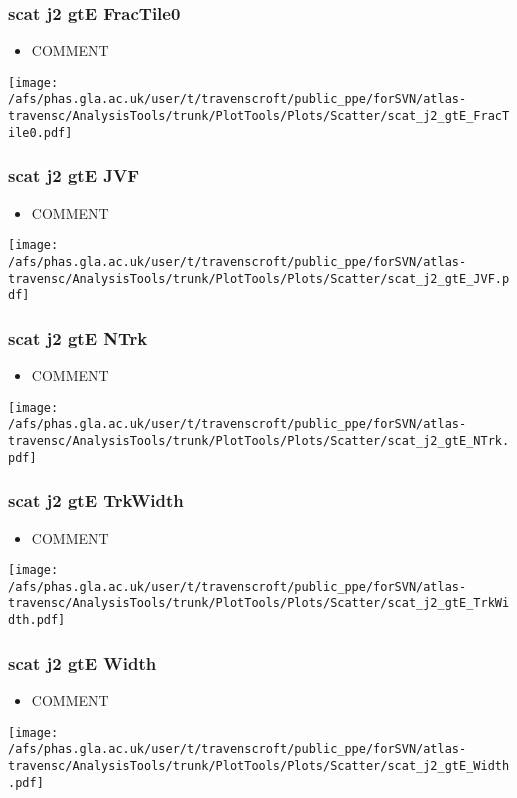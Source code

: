 \documentclass{beamer}
\begin{document}
\begin{frame}
\frametitle{scat j2 gtE FracTile0}
\begin{itemize}
\item COMMENT
\end{itemize}
\begin{center}
\texttt{[image: /afs/phas.gla.ac.uk/user/t/travenscroft/public\_ppe/forSVN/atlas-travensc/AnalysisTools/trunk/PlotTools/Plots/Scatter/scat\_j2\_gtE\_FracTile0.pdf]}
\end{center}
\end{frame}

\begin{frame}
\frametitle{scat j2 gtE JVF}
\begin{itemize}
\item COMMENT
\end{itemize}
\begin{center}
\texttt{[image: /afs/phas.gla.ac.uk/user/t/travenscroft/public\_ppe/forSVN/atlas-travensc/AnalysisTools/trunk/PlotTools/Plots/Scatter/scat\_j2\_gtE\_JVF.pdf]}
\end{center}
\end{frame}

\begin{frame}
\frametitle{scat j2 gtE NTrk}
\begin{itemize}
\item COMMENT
\end{itemize}
\begin{center}
\texttt{[image: /afs/phas.gla.ac.uk/user/t/travenscroft/public\_ppe/forSVN/atlas-travensc/AnalysisTools/trunk/PlotTools/Plots/Scatter/scat\_j2\_gtE\_NTrk.pdf]}
\end{center}
\end{frame}

\begin{frame}
\frametitle{scat j2 gtE TrkWidth}
\begin{itemize}
\item COMMENT
\end{itemize}
\begin{center}
\texttt{[image: /afs/phas.gla.ac.uk/user/t/travenscroft/public\_ppe/forSVN/atlas-travensc/AnalysisTools/trunk/PlotTools/Plots/Scatter/scat\_j2\_gtE\_TrkWidth.pdf]}
\end{center}
\end{frame}

\begin{frame}
\frametitle{scat j2 gtE Width}
\begin{itemize}
\item COMMENT
\end{itemize}
\begin{center}
\texttt{[image: /afs/phas.gla.ac.uk/user/t/travenscroft/public\_ppe/forSVN/atlas-travensc/AnalysisTools/trunk/PlotTools/Plots/Scatter/scat\_j2\_gtE\_Width.pdf]}
\end{center}
\end{frame}
\end{document}
